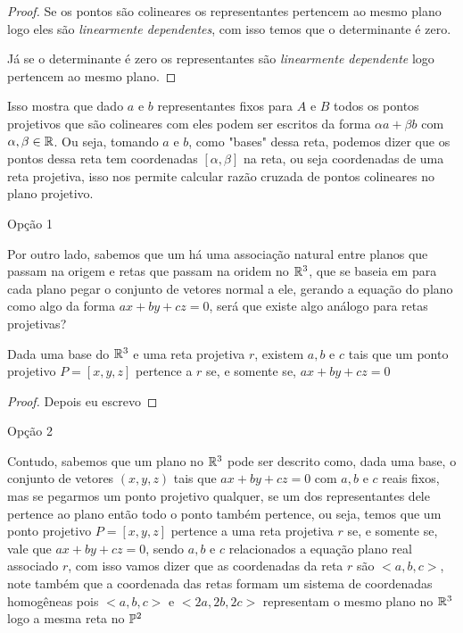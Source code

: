 \begin{proof}
Se os pontos são colineares os representantes pertencem ao mesmo plano logo eles são \textit{linearmente dependentes}, com isso temos que o determinante é zero.

Já se o determinante é zero os representantes são \textit{linearmente dependente} logo pertencem ao mesmo plano.
\end{proof}

Isso mostra que dado $a$ e $b$ representantes fixos para $A$ e $B$ todos os pontos projetivos que são colineares com eles podem ser escritos da forma $\alpha a + \beta b$ com $\alpha,\beta \in \mathbb{R}$. Ou seja, tomando $a$ e $b$, como "bases" dessa reta, podemos dizer que os pontos dessa reta tem coordenadas $[\alpha,\beta]$ na reta, ou seja coordenadas de uma reta projetiva, isso nos permite calcular razão cruzada de pontos colineares no plano projetivo.

Opção 1

Por outro lado, sabemos que um há uma associação natural entre planos que passam na origem e retas que passam na oridem no $\mathbb{R}^3$, que se baseia em para cada plano pegar o conjunto de vetores normal a ele, gerando a equação do plano como algo da forma $ax+by+cz = 0$, será que existe algo análogo para retas projetivas?

\begin{thm}
Dada uma base do $\mathbb{R}^3$ e uma reta projetiva $r$, existem $a,b$ e $c$ tais que um ponto projetivo $P = [x,y,z]$ pertence a $r$ se, e somente se, $ax+by+cz=0$
\end{thm}
\begin{proof}
Depois eu escrevo
\end{proof}

Opção 2

Contudo, sabemos que um plano no $\mathbb{R}^3$ pode ser descrito como, dada uma base, o conjunto de vetores $(x,y,z)$ tais que $ax+by+cz = 0$ com $a,b$ e $c$ reais fixos, mas se pegarmos um ponto projetivo qualquer, se um dos representantes dele pertence ao plano então todo o ponto também pertence, ou seja, temos que um ponto projetivo $P = [x,y,z]$ pertence a uma reta projetiva $r$ se, e somente se, vale que $ax+by+cz = 0$, sendo $a,b$ e $c$ relacionados a equação plano real associado $r$, com isso vamos dizer que as coordenadas da reta $r$ são $<a,b,c>$, note também que a coordenada das retas formam um sistema de coordenadas homogêneas pois $<a,b,c>$ e $<2a,2b,2c>$ representam o mesmo plano no $\mathbb{R}^3$ logo a mesma reta no $\mathbb{P}^2$

